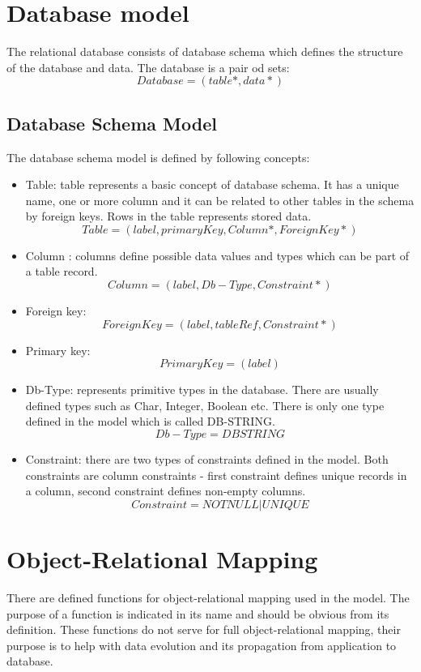 \documentclass[11pt]{article}
\begin{document}

\section{Database model}
The relational database consists of database schema which defines the structure of the database and data. The database is a pair od sets:
$$
Database = (table*, data*)
$$

\subsection{Database Schema Model}
The database schema model is defined by following concepts:
\begin{itemize}
	\item Table: table represents a basic concept of database schema. It has a unique name, one or more column and it can be related to other tables in the schema by foreign keys. Rows in the table represents stored data.
$$
Table = (label, primaryKey, Column*, ForeignKey*)
$$
	\item Column : columns define possible data values and types which can be part of a table record.
$$
Column = (label, Db-Type, Constraint*)
$$

	\item Foreign key:
$$
ForeignKey = (label, tableRef, Constraint*)
$$

	\item Primary key:
$$
PrimaryKey =  (label) 	
$$

	\item Db-Type: represents primitive types in the database. There are usually defined types such as Char, Integer, Boolean etc. There is only one type defined in the model which is called DB-STRING.
$$
Db-Type = DBSTRING
$$

	\item Constraint: there are two types of constraints defined in the model. Both constraints are column constraints - first constraint defines unique records in a column, second constraint defines non-empty columns.
$$
Constraint = NOTNULL | UNIQUE 
$$
\end{itemize}

\section{Object-Relational Mapping}
There are defined functions for object-relational mapping used in the model. The purpose of a function is indicated in its name and should be obvious from its definition. These functions do not serve for full object-relational mapping, their purpose is to help with data evolution and its propagation from application to database.
\end{document}
